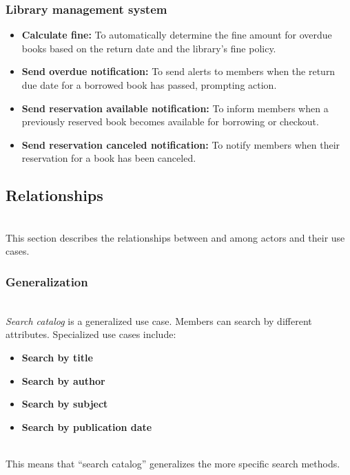 \subsubsection{Library management system}\label{PwSssY8oFBZCleQTscbEu}

\begin{itemize}
\item
\protect{}\label{DF6DoiVDIOl_ApxkHVnJY}
\textbf{Calculate fine:} To automatically determine the fine amount for overdue books based on the return date and the library's fine policy.
\item
\protect{}\label{N0JG4CuCdaFmauP4Rl_XQ}
\textbf{Send overdue notification:} To send alerts to members when the return due date for a borrowed book has passed, prompting action.
\item
\protect{}\label{W7H8N2HewEO5pwWJP1Ntr}
\textbf{Send reservation available notification:} To inform members when a previously reserved book becomes available for borrowing or checkout.
\item
\protect{}\label{XWpYO4g1N9PUUjKtGI7zw}
\textbf{Send reservation canceled notification:} To notify members when their reservation for a book has been canceled.
\end{itemize}

\subsection{Relationships}\label{iFnbUTv-9Y2NrB6jSIH9G}
\\
This section describes the relationships between and among actors and their use cases.

\subsubsection{Generalization}\label{Io6fG83UVen8flYWngd4r}
\\
\emph{Search catalog} is a generalized use case. Members can search by different attributes. Specialized use cases include:

\begin{itemize}
\item
\protect{}\label{eTIWGam3Y_SvFAd2yDUsg}
\textbf{Search by title}
\item
\protect{}\label{DOjJ2ZJ8KzfpZ4-Lp5pKy}
\textbf{Search by author}
\item
\protect{}\label{BvvgGjXjQPn5ayYfyHK5h}
\textbf{Search by subject}
\item
\protect{}\label{zIMBnCIVscvDgi5ZbDcrV}
\textbf{Search by publication date}
\end{itemize}
\\
This means that ``search catalog'' generalizes the more specific search methods.

